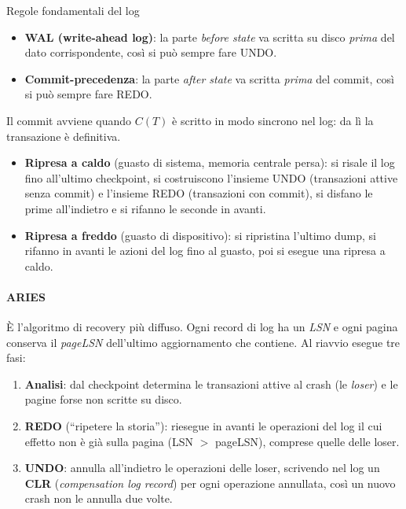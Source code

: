 \documentclass[12pt]{extarticle}
\begin{document}
\begin{cbox}{Regole fondamentali del log}
\begin{itemize}
    \item \textbf{WAL (write-ahead log)}: la parte \textit{before state} va scritta su disco \emph{prima} del dato corrispondente, così si può sempre fare UNDO.
    \item \textbf{Commit-precedenza}: la parte \textit{after state} va scritta \emph{prima} del commit, così si può sempre fare REDO.
\end{itemize}
Il commit avviene quando $C(T)$ è scritto in modo sincrono nel log: da lì la transazione è definitiva.
\end{cbox}

\begin{itemize}
    \item \textbf{Ripresa a caldo} (guasto di sistema, memoria centrale persa): si risale il log fino all'ultimo checkpoint, si costruiscono l'insieme UNDO (transazioni attive senza commit) e l'insieme REDO (transazioni con commit), si disfano le prime all'indietro e si rifanno le seconde in avanti.
    \item \textbf{Ripresa a freddo} (guasto di dispositivo): si ripristina l'ultimo dump, si rifanno in avanti le azioni del log fino al guasto, poi si esegue una ripresa a caldo.
\end{itemize}

\paragraph{ARIES}
È l'algoritmo di recovery più diffuso. Ogni record di log ha un \textit{LSN} e ogni pagina conserva il \textit{pageLSN} dell'ultimo aggiornamento che contiene. Al riavvio esegue tre fasi:
\begin{enumerate}
    \item \textbf{Analisi}: dal checkpoint determina le transazioni attive al crash (le \textit{loser}) e le pagine forse non scritte su disco.
    \item \textbf{REDO} (``ripetere la storia''): riesegue in avanti le operazioni del log il cui effetto non è già sulla pagina (LSN $>$ pageLSN), comprese quelle delle loser.
    \item \textbf{UNDO}: annulla all'indietro le operazioni delle loser, scrivendo nel log un \textbf{CLR} (\textit{compensation log record}) per ogni operazione annullata, così un nuovo crash non le annulla due volte.
\end{enumerate}
\end{document}
